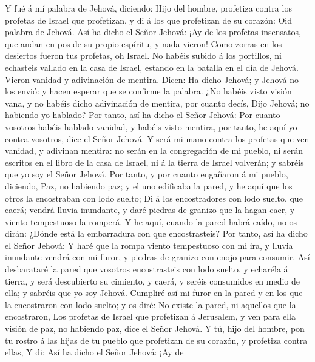  Y fué á mí palabra de Jehová, diciendo:  Hijo
del hombre, profetiza contra los profetas de Israel que profetizan, y di
á los que profetizan de su corazón: Oid palabra de Jehová. 
Así ha dicho el Señor Jehová: ¡Ay de los profetas insensatos, que andan
en pos de su propio espíritu, y nada vieron!  Como zorras en
los desiertos fueron tus profetas, oh Israel.  No habéis
subido á los portillos, ni echasteis vallado en la casa de Israel,
estando en la batalla en el día de Jehová.  Vieron vanidad y
adivinación de mentira. Dicen: Ha dicho Jehová; y Jehová no los envió: y
hacen esperar que se confirme la palabra.  ¿No habéis visto
visión vana, y no habéis dicho adivinación de mentira, por cuanto decís,
Dijo Jehová; no habiendo yo hablado?  Por tanto, así ha
dicho el Señor Jehová: Por cuanto vosotros habéis hablado vanidad, y
habéis visto mentira, por tanto, he aquí yo contra vosotros, dice el
Señor Jehová.  Y será mi mano contra los profetas que ven
vanidad, y adivinan mentira: no serán en la congregación de mi pueblo,
ni serán escritos en el libro de la casa de Israel, ni á la tierra de
Israel volverán; y sabréis que yo soy el Señor Jehová.  Por
tanto, y por cuanto engañaron á mi pueblo, diciendo, Paz, no habiendo
paz; y el uno edificaba la pared, y he aquí que los otros la encostraban
con lodo suelto;  Di á los encostradores con lodo suelto,
que caerá; vendrá lluvia inundante, y daré piedras de granizo que la
hagan caer, y viento tempestuoso la romperá.  Y he aquí,
cuando la pared habrá caído, no os dirán: ¿Dónde está la embarradura con
que encostrasteis?  Por tanto, así ha dicho el Señor
Jehová: Y haré que la rompa viento tempestuoso con mi ira, y lluvia
inundante vendrá con mi furor, y piedras de granizo con enojo para
consumir.  Así desbarataré la pared que vosotros
encostrasteis con lodo suelto, y echaréla á tierra, y será descubierto
su cimiento, y caerá, y seréis consumidos en medio de ella; y sabréis
que yo soy Jehová.  Cumpliré así mi furor en la pared y en
los que la encostraron con lodo suelto; y os diré: No existe la pared,
ni aquellos que la encostraron,  Los profetas de Israel que
profetizan á Jerusalem, y ven para ella visión de paz, no habiendo paz,
dice el Señor Jehová.  Y tú, hijo del hombre, pon tu rostro
á las hijas de tu pueblo que profetizan de su corazón, y profetiza
contra ellas,  Y di: Así ha dicho el Señor Jehová: ¡Ay de
